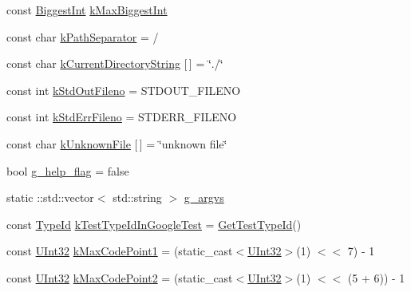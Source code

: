 \begin{DoxyCompactItemize}
\item 
const \mbox{\hyperlink{namespacetesting_1_1internal_a05c6bd9ede5ccdf25191a590d610dcc6}{Biggest\+Int}} \mbox{\hyperlink{namespacetesting_1_1internal_ad901880198832bc166d2493096b451f7}{k\+Max\+Biggest\+Int}}
\item 
const char \mbox{\hyperlink{namespacetesting_1_1internal_afcd71adaa9d1e6df7b282a17fc48125c}{k\+Path\+Separator}} = \textquotesingle{}/\textquotesingle{}
\item 
const char \mbox{\hyperlink{namespacetesting_1_1internal_af0c1ffec2a97f6094e956d46c07f0b5d}{k\+Current\+Directory\+String}} \mbox{[}$\,$\mbox{]} = \char`\"{}./\char`\"{}
\item 
const int \mbox{\hyperlink{namespacetesting_1_1internal_a24f0a3d50cac54a9132f4828ec9b96d9}{k\+Std\+Out\+Fileno}} = S\+T\+D\+O\+U\+T\+\_\+\+F\+I\+L\+E\+NO
\item 
const int \mbox{\hyperlink{namespacetesting_1_1internal_a747eccfdbdee3ff8af3bedc476a57c85}{k\+Std\+Err\+Fileno}} = S\+T\+D\+E\+R\+R\+\_\+\+F\+I\+L\+E\+NO
\item 
const char \mbox{\hyperlink{namespacetesting_1_1internal_ae16ec72cbaf31c1b9a5abf9be4478c5b}{k\+Unknown\+File}} \mbox{[}$\,$\mbox{]} = \char`\"{}unknown file\char`\"{}
\item 
bool \mbox{\hyperlink{namespacetesting_1_1internal_a93a772f5e51973b105d91cbb66a203f4}{g\+\_\+help\+\_\+flag}} = false
\item 
static \+::std\+::vector$<$ std\+::string $>$ \mbox{\hyperlink{namespacetesting_1_1internal_a0f037082066d55888583211489fa5573}{g\+\_\+argvs}}
\item 
const \mbox{\hyperlink{namespacetesting_1_1internal_a38c435cbab5f8b784e2e7f3356cab242}{Type\+Id}} \mbox{\hyperlink{namespacetesting_1_1internal_acac7993efabbd9dd62c1e9c7d143a72f}{k\+Test\+Type\+Id\+In\+Google\+Test}} = \mbox{\hyperlink{namespacetesting_1_1internal_ad0d66d56ead224263cd100c1d6bfc562}{Get\+Test\+Type\+Id}}()
\item 
const \mbox{\hyperlink{namespacetesting_1_1internal_a436defbb8e92c8e94e33ebcc86f278ba}{U\+Int32}} \mbox{\hyperlink{namespacetesting_1_1internal_a128515c8ed6c0fe98e498c8042da2060}{k\+Max\+Code\+Point1}} = (static\+\_\+cast$<$\mbox{\hyperlink{namespacetesting_1_1internal_a436defbb8e92c8e94e33ebcc86f278ba}{U\+Int32}}$>$(1) $<$$<$ 7) -\/ 1
\item 
const \mbox{\hyperlink{namespacetesting_1_1internal_a436defbb8e92c8e94e33ebcc86f278ba}{U\+Int32}} \mbox{\hyperlink{namespacetesting_1_1internal_ab8f4a5ed784352f00342cfeadc72337e}{k\+Max\+Code\+Point2}} = (static\+\_\+cast$<$\mbox{\hyperlink{namespacetesting_1_1internal_a436defbb8e92c8e94e33ebcc86f278ba}{U\+Int32}}$>$(1) $<$$<$ (5 + 6)) -\/ 1

\end{DoxyCompactItemize}

